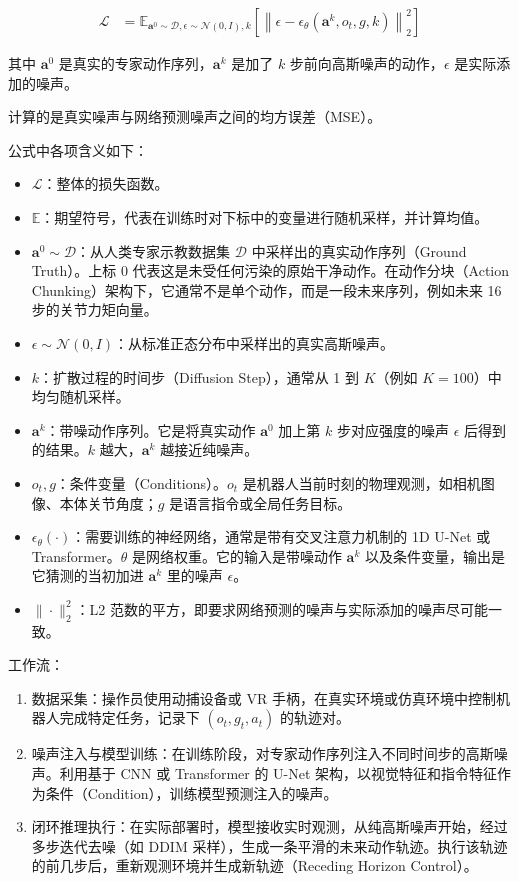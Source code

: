 \[
\begin{aligned}
\mathcal{L}
&=
\mathbb{E}_{\mathbf{a}^0\sim\mathcal{D},\epsilon\sim\mathcal{N}(0,I),k}
\left[
\left\|
\epsilon-\epsilon_\theta(\mathbf{a}^k,o_t,g,k)
\right\|_2^2
\right]
\end{aligned}
\]

其中 \(\mathbf{a}^0\) 是真实的专家动作序列，\(\mathbf{a}^k\) 是加了 \(k\) 步前向高斯噪声的动作，\(\epsilon\) 是实际添加的噪声。

计算的是真实噪声与网络预测噪声之间的均方误差（MSE）。

公式中各项含义如下：

\begin{itemize}
\tightlist
\item
  \(\mathcal{L}\)：整体的损失函数。
\item
  \(\mathbb{E}\)：期望符号，代表在训练时对下标中的变量进行随机采样，并计算均值。
\item
  \(\mathbf{a}^0\sim\mathcal{D}\)：从人类专家示教数据集 \(\mathcal{D}\) 中采样出的真实动作序列（Ground Truth）。上标 0 代表这是未受任何污染的原始干净动作。在动作分块（Action Chunking）架构下，它通常不是单个动作，而是一段未来序列，例如未来 16 步的关节力矩向量。
\item
  \(\epsilon\sim\mathcal{N}(0,I)\)：从标准正态分布中采样出的真实高斯噪声。
\item
  \(k\)：扩散过程的时间步（Diffusion Step），通常从 1 到 \(K\)（例如 \(K=100\)）中均匀随机采样。
\item
  \(\mathbf{a}^k\)：带噪动作序列。它是将真实动作 \(\mathbf{a}^0\) 加上第 \(k\) 步对应强度的噪声 \(\epsilon\) 后得到的结果。\(k\) 越大，\(\mathbf{a}^k\) 越接近纯噪声。
\item
  \(o_t,g\)：条件变量（Conditions）。\(o_t\) 是机器人当前时刻的物理观测，如相机图像、本体关节角度；\(g\) 是语言指令或全局任务目标。
\item
  \(\epsilon_\theta(\cdot)\)：需要训练的神经网络，通常是带有交叉注意力机制的 1D U-Net 或 Transformer。\(\theta\) 是网络权重。它的输入是带噪动作 \(\mathbf{a}^k\) 以及条件变量，输出是它猜测的当初加进 \(\mathbf{a}^k\) 里的噪声 \(\epsilon\)。
\item
  \(\|\cdot\|_2^2\)：L2 范数的平方，即要求网络预测的噪声与实际添加的噪声尽可能一致。
\end{itemize}

工作流：

\begin{enumerate}
\def\labelenumi{\arabic{enumi}.}
\tightlist
\item
  数据采集：操作员使用动捕设备或 VR 手柄，在真实环境或仿真环境中控制机器人完成特定任务，记录下 \((o_t,g_t,a_t)\) 的轨迹对。
\item
  噪声注入与模型训练：在训练阶段，对专家动作序列注入不同时间步的高斯噪声。利用基于 CNN 或 Transformer 的 U-Net 架构，以视觉特征和指令特征作为条件（Condition），训练模型预测注入的噪声。
\item
  闭环推理执行：在实际部署时，模型接收实时观测，从纯高斯噪声开始，经过多步迭代去噪（如 DDIM 采样），生成一条平滑的未来动作轨迹。执行该轨迹的前几步后，重新观测环境并生成新轨迹（Receding Horizon Control）。
\end{enumerate}

